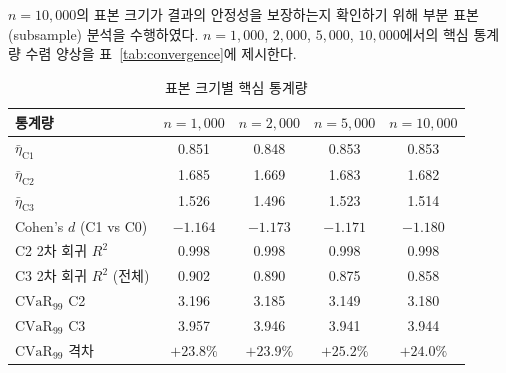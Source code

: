 

\section{}
\label{sec:convergence}

\subsection{}
\label{subsec:sample_size}

$n = 10{,}000$의 표본 크기가 결과의 안정성을 보장하는지 확인하기 위해
부분 표본(subsample) 분석을 수행하였다. $n = 1{,}000$, $2{,}000$, $5{,}000$,
$10{,}000$에서의 핵심 통계량 수렴 양상을 \p{[}표~\vref{tab:convergence}\p{]}에 제시한다.

\begin{table}[htbp]
  \centering
  \caption{표본 크기별 핵심 통계량 }
  \label{tab:convergence}
  \small
  \begin{tabular}{lcccc}
    \toprule
    통계량 & $n = 1{,}000$ & $n = 2{,}000$ & $n = 5{,}000$ & $n = 10{,}000$ \\
    \midrule
    $\bar{\eta}_{\text{C1}}$ & 0.851 & 0.848 & 0.853 & 0.853 \\
    $\bar{\eta}_{\text{C2}}$ & 1.685 & 1.669 & 1.683 & 1.682 \\
    $\bar{\eta}_{\text{C3}}$ & 1.526 & 1.496 & 1.523 & 1.514 \\
    Cohen's $d$ (C1 vs C0) & $-1.164$ & $-1.173$ & $-1.171$ & $-1.180$ \\
    C2 2차 회귀 $R^2$ & 0.998 & 0.998 & 0.998 & 0.998 \\
    C3 2차 회귀 $R^2$ (전체) & 0.902 & 0.890 & 0.875 & 0.858 \\
    \midrule
    $\mathrm{CVaR}_{99}$ C2 & 3.196 & 3.185 & 3.149 & 3.180 \\
    $\mathrm{CVaR}_{99}$ C3 & 3.957 & 3.946 & 3.941 & 3.944 \\
    $\mathrm{CVaR}_{99}$ 격차 & $+23.8\%$ & $+23.9\%$ & $+25.2\%$ & $+24.0\%$ \\
    \bottomrule
  \end{tabular}
\end{table}


